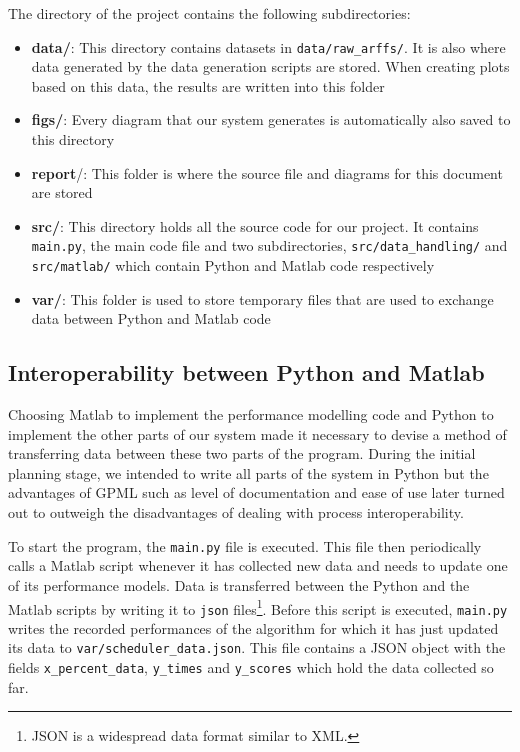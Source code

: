 \documentclass[a4paper,12pt,twoside,openright]{report}
\begin{document}
The directory of the project contains the following subdirectories:
\begin{itemize}
\item \textbf{data/}: This directory contains datasets in \texttt{data/raw\_arffs/}. It is also where data generated by the data generation scripts are stored. When creating plots based on this data, the results are written into this folder
\item \textbf{figs/}: Every diagram that our system generates is automatically also saved to this directory
\item \textbf{report}/: This folder is where the source file and diagrams for this document are stored
\item \textbf{src/}: This directory holds all the source code for our project. It contains \texttt{main.py}, the main code file and two subdirectories, \texttt{src/data\_handling/} and \texttt{src/matlab/} which contain Python and Matlab code respectively
\item \textbf{var/}: This folder is used to store temporary files that are used to exchange data between Python and Matlab code
\end{itemize}

\subsection{Interoperability between Python and Matlab}
Choosing Matlab to implement the performance modelling code and Python to implement the other parts of our system made it necessary to devise a method of transferring data between these two parts of the program. During the initial planning stage, we intended to write all parts of the system in Python but the advantages of GPML such as level of documentation and ease of use later turned out to outweigh the disadvantages of dealing with process interoperability.

To start the program, the \texttt{main.py} file is executed. This file then periodically calls a Matlab script whenever it has collected new data and needs to update one of its performance models. Data is transferred between the Python and the Matlab scripts by writing it to \texttt{json} files\footnote{JSON is a widespread data format similar to XML.}. Before this script is executed, \texttt{main.py} writes the recorded performances of the algorithm for which it has just updated its data to \texttt{var/scheduler\_data.json}. This file contains a JSON object with the fields \texttt{x\_percent\_data}, \texttt{y\_times} and \texttt{y\_scores} which hold the data collected so far.
\end{document}
